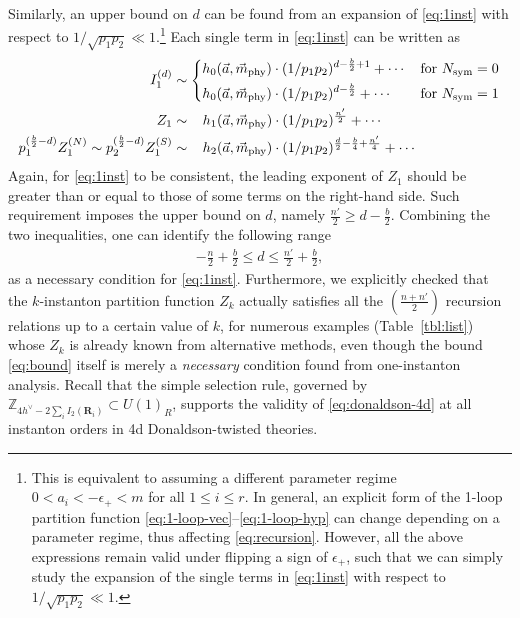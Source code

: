 \documentclass[letterpaper, 11pt]{article}
\newcommand{\nn}{\nonumber}
\def\IZ{\mathbb{Z}}
\def\e{\epsilon}
\begin{document}
{Similarly, an upper bound on $d$ can be found from an expansion of \eqref{eq:1inst} with respect to $ 1/\sqrt{p_1p_2} \ll 1$.\footnote{This is equivalent to assuming a different parameter regime $ 0 < a_i < -\e_+ < m$ for all $1\leq i \leq r$. In general, an explicit form of the 1-loop partition function \eqref{eq:1-loop-vec}--\eqref{eq:1-loop-hyp} can change depending on a parameter regime, thus affecting \eqref{eq:recursion}. However, all the above expressions remain valid under flipping a sign of $\epsilon_+$, such that we can simply study the expansion of the single terms in \eqref{eq:1inst} with respect to $ 1/\sqrt{p_1p_2} \ll 1$.} 
Each single term in \eqref{eq:1inst} can be written as
\begin{align}
  I_1^{(d)} &\sim \begin{dcases}
    h_0(\vec{a},  \vec{m}_{\text{phy}})\cdot  (1/p_1p_2)^{d-\frac{b}{2} + 1} + \cdots   &  \text{for }N_\text{sym} = 0\\
    h_0(\vec{a},  \vec{m}_{\text{phy}})\cdot (1/p_1p_2)^{d-\frac{b}{2} } + \cdots    &  \text{for }N_\text{sym} = 1
\end{dcases}
  \nn \\
  Z_1 &\sim  \ \ \,  h_1(\vec{a},  \vec{m}_{\text{phy}})\cdot (1/p_1p_2)^{\frac{n'}{2}}  + \cdots  \nn \\
  p_1^{(\frac{b}{2}-d)}Z_1^{(N)} \sim  p_2^{(\frac{b}{2}-d)}  Z^{(S)}_1&\sim \ \ \,  h_2(\vec{a},  \vec{m}_{\text{phy}})\cdot  (1/p_1p_2)^{\frac{d}{2}-\frac{b}{4}+\frac{n'}{4}}   + \cdots   
\end{align}
Again, for \eqref{eq:1inst} to be consistent, the leading exponent of $Z_1$ should be greater than or equal to those of some terms on the right-hand side. Such requirement imposes the upper bound on $d$, namely  $\frac{n'}{2} \geq  d - \frac{b}{2}$.
Combining the two inequalities,  one can identify the following range
\begin{align}
  \label{eq:bound}
  -\frac{n}{2} + \frac{b}{2} \leq d \leq \frac{n'}{2} + \frac{b}{2},
\end{align}
as a necessary condition for \eqref{eq:1inst}. Furthermore, we explicitly checked that the $k$-instanton partition function $Z_k$ actually satisfies all the $(\frac{n+n'}{2})$ recursion relations up to a certain value of $k$, for numerous examples (Table~\ref{tbl:list}) whose $Z_k$ is already known from alternative methods, even though the bound \eqref{eq:bound} itself is merely a \emph{necessary} condition found from one-instanton analysis. Recall that the simple selection rule, governed by $\IZ_{4h^\vee - 2\sum_i I_2(\mathbf{R}_i)} \subset U(1)_R$, supports the validity of \eqref{eq:donaldson-4d} at all instanton orders in 4d Donaldson-twisted theories. 
}
\end{document}
